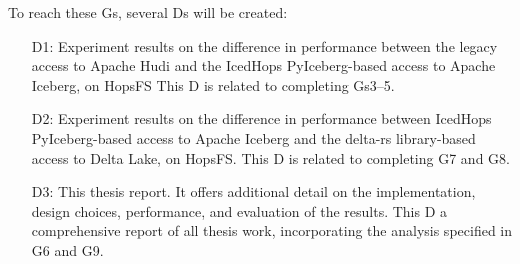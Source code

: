 To reach these \glspl{G}, several \glspl{D} will be created:
\begin{enumerate}
    \item[D1:] Experiment results on the difference in performance between the legacy access to Apache Hudi and the IcedHops PyIceberg-based access to Apache Iceberg, on \gls{HopsFS}
    This \gls{D} is related to completing \glspl{G}3--5.
    \item[D2:] Experiment results on the difference in performance between IcedHops PyIceberg-based access to Apache Iceberg and the delta-rs library-based access to Delta Lake, on \gls{HopsFS}.
    This \gls{D} is related to completing \gls{G}7 and \gls{G}8.
    \item[D3:] This thesis report. It offers additional detail on the implementation, design choices, performance, and evaluation of the results.
    This \gls{D} a comprehensive report of all thesis work, incorporating the analysis specified in \gls{G}6 and \gls{G}9.
\end{enumerate}
